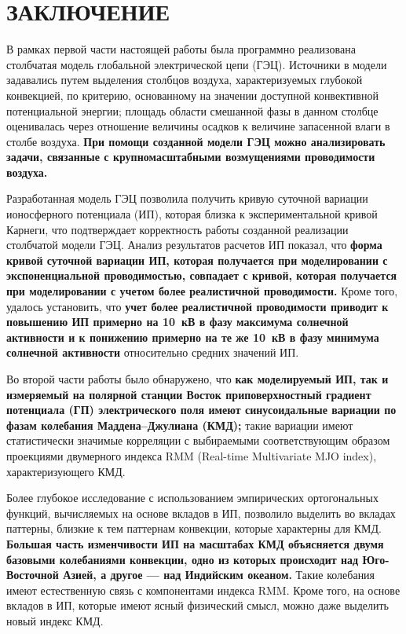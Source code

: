  \section{ЗАКЛЮЧЕНИЕ}

В рамках первой части настоящей работы была программно реализована столбчатая модель глобальной электрической цепи (ГЭЦ). Источники в модели задавались путем выделения столбцов воздуха, характеризуемых глубокой конвекцией, по критерию, основанному на значении доступной конвективной потенциальной энергии; площадь области смешанной фазы в данном столбце оценивалась через отношение величины осадков к величине запасенной влаги в столбе воздуха. \textbf{При помощи созданной модели ГЭЦ можно анализировать задачи, связанные с крупномасштабными возмущениями проводимости воздуха.}


Разработанная модель ГЭЦ позволила получить кривую суточной вариации ионосферного потенциала (ИП), которая близка к экспериментальной кривой Карнеги, что подтверждает корректность работы созданной реализации столбчатой модели ГЭЦ. Анализ результатов расчетов ИП показал, что \textbf{форма кривой суточной вариации ИП, которая получается при моделировании с экспоненциальной проводимостью, совпадает с кривой, которая получается при моделировании с учетом более реалистичной проводимости.} Кроме того, удалось установить, что \textbf{учет более реалистичной проводимости приводит к повышению ИП примерно на 10~кВ в фазу максимума солнечной активности и к понижению примерно на те же 10~кВ в фазу минимума солнечной активности} относительно средних значений ИП.

Во второй части работы было обнаружено, что \textbf{как моделируемый ИП, так и измеряемый на полярной станции Восток приповерхностный градиент потенциала (ГП) электрического поля имеют синусоидальные вариации по фазам колебания Мад\-де\-на--Джу\-ли\-ана (КМД);} такие вариации имеют статистически значимые корреляции с выбираемыми соответствующим образом проекциями двумерного индекса RMM (Real-time Multivariate MJO index), характеризующего КМД.

Более глубокое исследование с использованием эмпирических ортогональных функций, вычисляемых на основе вкладов в ИП, позволило выделить во вкладах паттерны, близкие к тем паттернам конвекции, которые характерны для КМД. \textbf{Большая часть изменчивости ИП на масштабах КМД объясняется двумя базовыми колебаниями конвекции, одно из которых происходит над Юго-Восточной Азией, а другое --- над Индийским океаном.} Такие колебания имеют естественную связь с компонентами индекса RMM. Кроме того, на основе вкладов в ИП, которые имеют ясный физический смысл, можно даже выделить новый индекс КМД.

